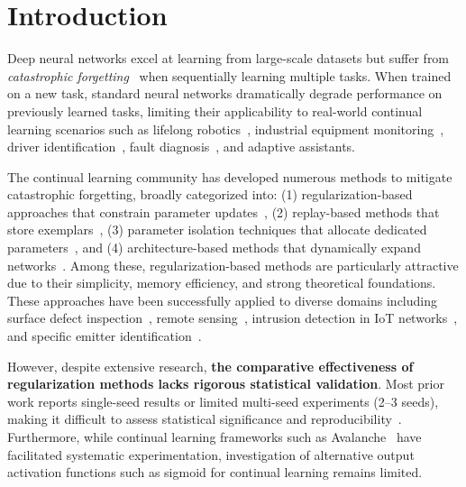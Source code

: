 \documentclass[preprint,review,12pt]{elsarticle}
\begin{document}
\section{Introduction}

Deep neural networks excel at learning from large-scale datasets but suffer from \textit{catastrophic forgetting}~\cite{mccloskey1989catastrophic,french1999catastrophic} when sequentially learning multiple tasks. When trained on a new task, standard neural networks dramatically degrade performance on previously learned tasks, limiting their applicability to real-world continual learning scenarios such as lifelong robotics~\cite{lesort2020continual}, industrial equipment monitoring~\cite{dallepezze2025multilabel}, driver identification~\cite{fanan2025driver}, fault diagnosis~\cite{yan2025compact,ding2024selfdriven,lin2025diffusion}, and adaptive assistants.

The continual learning community has developed numerous methods to mitigate catastrophic forgetting, broadly categorized into: (1) regularization-based approaches that constrain parameter updates~\cite{kirkpatrick2017overcoming,zenke2017continual,aljundi2018memory}, (2) replay-based methods that store exemplars~\cite{rebuffi2017icarl,chaudhry2019tiny}, (3) parameter isolation techniques that allocate dedicated parameters~\cite{rusu2016progressive,mallya2018packnet}, and (4) architecture-based methods that dynamically expand networks~\cite{yoon2017lifelong,xu2018reinforced}. Among these, regularization-based methods are particularly attractive due to their simplicity, memory efficiency, and strong theoretical foundations. These approaches have been successfully applied to diverse domains including surface defect inspection~\cite{chen2025surface}, remote sensing~\cite{chen2023online}, intrusion detection in IoT networks~\cite{zhang2024federated}, and specific emitter identification~\cite{liu2024emitter}.

However, despite extensive research, \textbf{the comparative effectiveness of regularization methods lacks rigorous statistical validation}. Most prior work reports single-seed results or limited multi-seed experiments (2--3 seeds), making it difficult to assess statistical significance and reproducibility~\cite{henderson2018deep,lucic2018gans}. Furthermore, while continual learning frameworks such as Avalanche~\cite{lomonaco2021avalanche} have facilitated systematic experimentation, investigation of alternative output activation functions such as sigmoid for continual learning remains limited.
\end{document}
